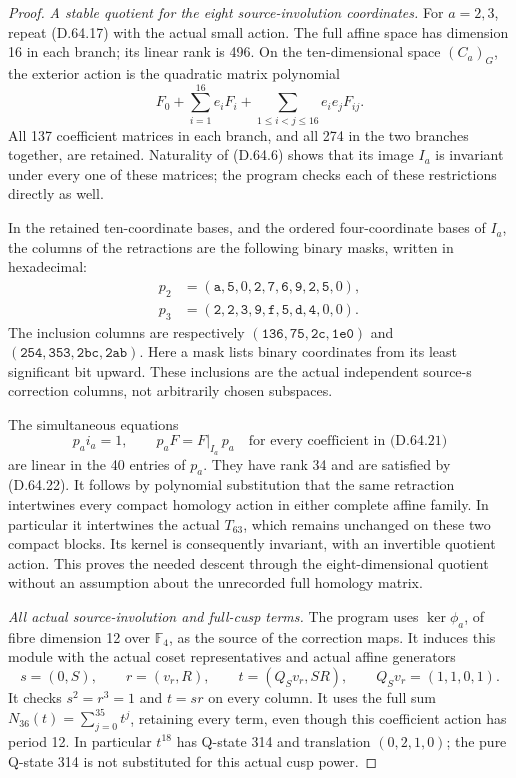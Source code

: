 \begin{proof}
\emph{A stable quotient for the eight source-involution coordinates.}
For \(a=2,3\), repeat (D.64.17) with the actual
small action. The full affine space has dimension
16 in each branch; its linear rank is 496.
On the ten-dimensional space \((C_a)_G\), the
exterior action is the quadratic matrix polynomial
\[
 F_0+\sum_{i=1}^{16}e_iF_i+
                    \sum_{1\leq i<j\leq16}e_ie_jF_{ij}.
 \tag{D.64.21}
\]
All 137 coefficient matrices in each branch,
and all 274 in the two branches together,
are retained. Naturality of (D.64.6) shows that
its image \(I_a\) is invariant under every one
of these matrices; the program checks each
of these restrictions directly as well.

In the retained ten-coordinate bases, and the
ordered four-coordinate bases of \(I_a\), the
columns of the retractions are the following
binary masks, written in hexadecimal:
\[
 \begin{aligned}
 p_2&=(\mathtt a,\mathtt5,0,\mathtt2,\mathtt7,
                    \mathtt6,\mathtt9,\mathtt2,\mathtt5,0),\\
 p_3&=(\mathtt2,\mathtt2,\mathtt3,\mathtt9,\mathtt f,
                    \mathtt5,\mathtt d,\mathtt4,0,0).
 \end{aligned}
 \tag{D.64.22}
\]
The inclusion columns are respectively
\((\mathtt{136},\mathtt{75},\mathtt{2c},\mathtt{1e0})\)
and
\((\mathtt{254},\mathtt{353},\mathtt{2bc},\mathtt{2ab})\).
Here a mask lists binary coordinates from its
least significant bit upward. These inclusions
are the actual independent source-s correction
columns, not arbitrarily chosen subspaces.

The simultaneous equations
\[
 p_ai_a=1,
 \qquad p_aF=F|_{I_a}\,p_a
       \quad\text{for every coefficient in (D.64.21)}
 \tag{D.64.23}
\]
are linear in the 40 entries of \(p_a\).
They have rank 34 and are satisfied by (D.64.22).
It follows by polynomial substitution that the
same retraction intertwines every compact
homology action in either complete affine family.
In particular it intertwines the actual
\(T_{63}\), which remains unchanged on these
two compact blocks. Its kernel is consequently
invariant, with an invertible quotient action.
This proves the needed descent through the
eight-dimensional quotient without an assumption
about the unrecorded full homology matrix.

\emph{All actual source-involution and full-cusp terms.}
The program 
uses \(\ker\phi_a\), of fibre dimension 12
over \(\mathbb F_4\), as the source of the
correction maps. It induces this module with
the actual coset representatives and actual
affine generators
\[
 s=(0,S),\qquad r=(v_r,R),\qquad
 t=(Q_Sv_r,SR),\qquad Q_Sv_r=(1,1,0,1).
 \tag{D.64.24}
\]
It checks \(s^2=r^3=1\) and \(t=sr\)
on every column. It uses the full sum
\(N_{36}(t)=\sum_{j=0}^{35}t^j\), retaining
every term, even though this coefficient
action has period 12. In particular
\(t^{18}\) has Q-state 314 and translation
\((0,2,1,0)\); the pure Q-state 314 is not
substituted for this actual cusp power.


\end{proof}
